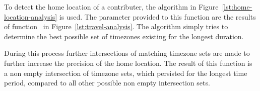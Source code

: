 To detect the home location of a contributer, the algorithm in Figure~\ref{lst:home-location-analysis} is used.
The parameter provided to this function are the results of function~ in Figure~\ref{lst:travel-analysis}.
The algorithm simply tries to determine the best possible set of timezones existing for the longest duration.

During this process further intersections of matching timezone sets are made to further increase the precision of the home location.
The result of this function is a non empty intersection of timezone sets, which persisted for the longest time period, compared to all other possible non empty intersection sets.

